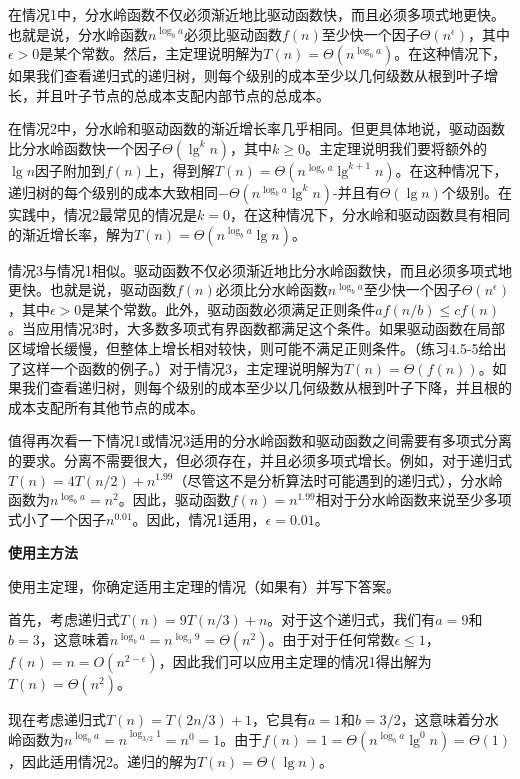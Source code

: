 \documentclass[lang=cn,newtx,10pt,scheme=chinese]{elegantbook}
\begin{document}
在情况1中，分水岭函数不仅必须渐近地比驱动函数快，而且必须多项式地更快。也就是说，分水岭函数$n^{\log _b a}$必须比驱动函数$f(n)$至少快一个因子$\Theta\left(n^\epsilon\right)$，其中$\epsilon>0$是某个常数。然后，主定理说明解为$T(n)=\Theta\left(n^{\log _b a}\right)$。在这种情况下，如果我们查看递归式的递归树，则每个级别的成本至少以几何级数从根到叶子增长，并且叶子节点的总成本支配内部节点的总成本。

在情况2中，分水岭和驱动函数的渐近增长率几乎相同。但更具体地说，驱动函数比分水岭函数快一个因子$\Theta\left(\lg ^k n\right)$，其中$k \geq 0$。主定理说明我们要将额外的$\lg n$因子附加到$f(n)$上，得到解$T(n)=\Theta\left(n^{\log _b a} \lg ^{k+1} n\right)$。在这种情况下，递归树的每个级别的成本大致相同$-\Theta\left(n^{\log _b a} \lg ^k n\right)$-并且有$\Theta(\lg n)$个级别。在实践中，情况2最常见的情况是$k=0$，在这种情况下，分水岭和驱动函数具有相同的渐近增长率，解为$T(n)=\Theta\left(n^{\log _b a} \lg n\right)$。

情况3与情况1相似。驱动函数不仅必须渐近地比分水岭函数快，而且必须多项式地更快。也就是说，驱动函数$f(n)$必须比分水岭函数$n^{\log _b a}$至少快一个因子$\Theta\left(n^\epsilon\right)$，其中$\epsilon>0$是某个常数。此外，驱动函数必须满足正则条件$a f(n / b) \leq c f(n)$。当应用情况3时，大多数多项式有界函数都满足这个条件。如果驱动函数在局部区域增长缓慢，但整体上增长相对较快，则可能不满足正则条件。（练习4.5-5给出了这样一个函数的例子。）对于情况3，主定理说明解为$T(n)=\Theta(f(n))$。如果我们查看递归树，则每个级别的成本至少以几何级数从根到叶子下降，并且根的成本支配所有其他节点的成本。

值得再次看一下情况1或情况3适用的分水岭函数和驱动函数之间需要有多项式分离的要求。分离不需要很大，但必须存在，并且必须多项式增长。例如，对于递归式$T(n)=4 T(n / 2)+n^{1.99}$（尽管这不是分析算法时可能遇到的递归式），分水岭函数为$n^{\log _b a}=n^2$。因此，驱动函数$f(n)=n^{1.99}$相对于分水岭函数来说至少多项式小了一个因子$n^{0.01}$。因此，情况1适用，$\epsilon=0.01$。

\textbf{使用主方法}

使用主定理，你确定适用主定理的情况（如果有）并写下答案。

首先，考虑递归式$T(n)=9 T(n / 3)+n$。对于这个递归式，我们有$a=9$和$b=3$，这意味着$n^{\log _b a}=n^{\log _3 9}=\Theta\left(n^2\right)$。由于对于任何常数$\epsilon \leq 1$，$f(n)=n=O\left(n^{2-\epsilon}\right)$，因此我们可以应用主定理的情况1得出解为$T(n)=\Theta\left(n^2\right)$。

现在考虑递归式$T(n)=T(2 n / 3)+1$，它具有$a=1$和$b=3 / 2$，这意味着分水岭函数为$n^{\log _b a}=n^{\log _{3 / 2} 1}=n^0=1$。由于$f(n)=1=\Theta\left(n^{\log _b a} \lg ^0 n\right)=\Theta(1)$，因此适用情况2。递归的解为$T(n)=\Theta(\lg n)$。
\end{document}
